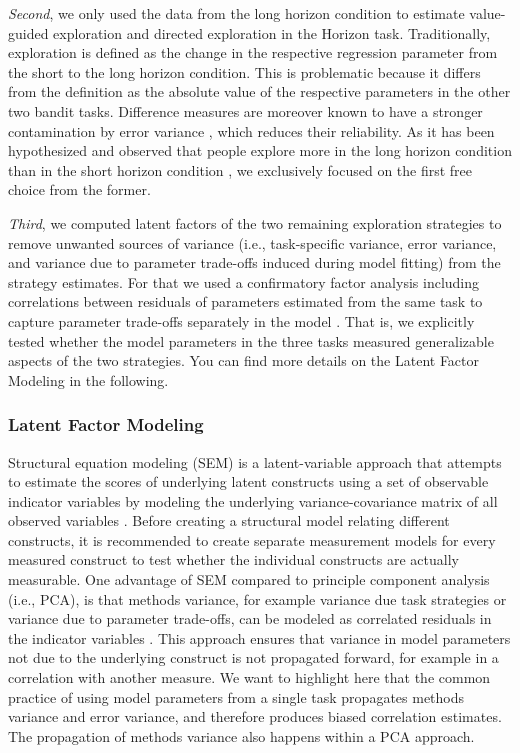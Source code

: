 \documentclass[fleqn,10pt]{wlscirep}
\begin{document}
\textit{Second}, we only used the data from the long horizon condition to estimate value-guided exploration and directed exploration in the Horizon task. Traditionally, exploration is defined as the change in the respective regression parameter from the short to the long horizon condition. This is problematic because it differs from the definition as the absolute value of the respective parameters in the other two bandit tasks. Difference measures are moreover known to have a stronger contamination by error variance \cite{hedge_reliability_2018, enkavi_large-scale_2019, salthouse_interpreting_2002}, which reduces their reliability. As it has been hypothesized and observed that people explore more in the long horizon condition than in the short horizon condition \cite{wilson_humans_2014, dubois_human_2021, dubois_value-free_2022}, we exclusively focused on the first free choice from the former.

\textit{Third}, we computed latent factors of the two remaining exploration strategies to remove unwanted sources of variance (i.e., task-specific variance, error variance, and variance due to parameter trade-offs induced during model fitting\cite{ratcliff_estimating_2002}) from the strategy estimates. For that we used a confirmatory factor analysis including correlations between residuals of parameters estimated from the same task to capture parameter trade-offs separately in the model \cite{schmiedek_individual_2007}. That is, we explicitly tested whether the model parameters in the three tasks measured generalizable aspects of the two strategies. You can find more details on the Latent Factor Modeling in the following.


\subsubsection*{Latent Factor Modeling}
Structural equation modeling (SEM) is a latent-variable approach that attempts to estimate the scores of underlying latent constructs using a set of observable indicator variables by modeling the underlying variance-covariance matrix of all observed variables \cite{Little2023}. Before creating a structural model relating different constructs, it is recommended to create separate measurement models for every measured construct \cite{Little2023} to test whether the individual constructs are actually measurable. One advantage of SEM compared to principle component analysis (i.e., PCA), is that methods variance, for example variance due task strategies or variance due to parameter trade-offs, can be modeled as correlated residuals in the indicator variables \cite{schmiedek_individual_2007}. This approach ensures that variance in model parameters not due to the underlying construct is not propagated forward, for example in a correlation with another measure. We want to highlight here that the common practice of using model parameters from a single task propagates methods variance and error variance, and therefore produces biased correlation estimates. The propagation of methods variance also happens within a PCA approach.
\end{document}
